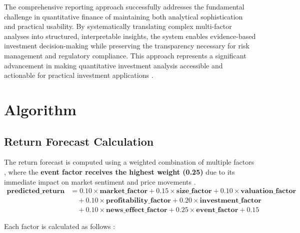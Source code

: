 \documentclass[3p,times,procedia]{elsarticle}
\begin{document}
The comprehensive reporting approach successfully addresses the fundamental challenge in quantitative finance of maintaining both analytical sophistication and practical usability. By systematically translating complex multi-factor analyses into structured, interpretable insights, the system enables evidence-based investment decision-making while preserving the transparency necessary for risk management and regulatory compliance. This approach represents a significant advancement in making quantitative investment analysis accessible and actionable for practical investment applications \cite{Harvey2016,Ribeiro2016}.

\vspace{0.10cm}
\section{Algorithm}

\subsection{Return Forecast Calculation}

The return forecast is computed using a weighted \allowbreak combination of multiple factors \cite{FAMA1993}, where the \textbf{event factor receives the highest weight (0.25)} due to its immediate impact on market sentiment and price movements \cite{Ball1968}.
\begin{align}
\mathbf{predicted\_return} &= 0.10 \times \mathbf{market\_factor} + 0.15 \times \mathbf{size\_factor} + 0.10 \times \mathbf{valuation\_factor} \nonumber \\
&\quad + 0.10 \times \mathbf{profitability\_factor} + 0.20 \times \mathbf{investment\_factor} \nonumber \\
&\quad + 0.10 \times \mathbf{news\_effect\_factor} + \mathbf{0.25} \times \mathbf{event\_factor} + 0.15
\end{align}


Each factor is calculated as follows \cite{Carhart1997}:
\end{document}
